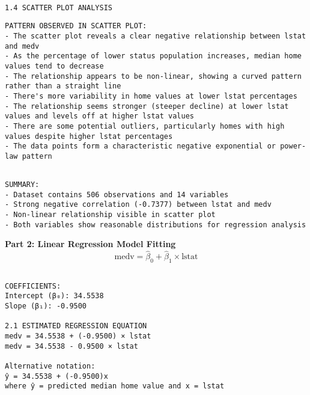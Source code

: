 \documentclass[8pt, twocolumn]{extarticle}
\begin{document}
    \begin{Verbatim}[commandchars=\\\{\}]

1.4 SCATTER PLOT ANALYSIS
    \end{Verbatim}

    \centering
    
    \begin{Verbatim}[commandchars=\\\{\}]
PATTERN OBSERVED IN SCATTER PLOT:
- The scatter plot reveals a clear negative relationship between lstat and medv
- As the percentage of lower status population increases, median home values tend to decrease
- The relationship appears to be non-linear, showing a curved pattern rather than a straight line
- There's more variability in home values at lower lstat percentages
- The relationship seems stronger (steeper decline) at lower lstat values and levels off at higher lstat values
- There are some potential outliers, particularly homes with high values despite higher lstat percentages
- The data points form a characteristic negative exponential or power-law pattern
    \end{Verbatim}

    \centering
    \begin{Verbatim}[commandchars=\\\{\}]

SUMMARY:
- Dataset contains 506 observations and 14 variables
- Strong negative correlation (-0.7377) between lstat and medv
- Non-linear relationship visible in scatter plot
- Both variables show reasonable distributions for regression analysis
    \end{Verbatim}

    \textbf{Part 2: Linear Regression Model Fitting}
\[
\text{medv} = \hat{\beta}_0 + \hat{\beta}_1 \times \text{lstat}
\]

    \begin{Verbatim}[commandchars=\\\{\}]

COEFFICIENTS:
Intercept (β₀): 34.5538
Slope (β₁): -0.9500

2.1 ESTIMATED REGRESSION EQUATION
medv = 34.5538 + (-0.9500) × lstat
medv = 34.5538 - 0.9500 × lstat

Alternative notation:
ŷ = 34.5538 + (-0.9500)x
where ŷ = predicted median home value and x = lstat
    \end{Verbatim}
\end{document}
